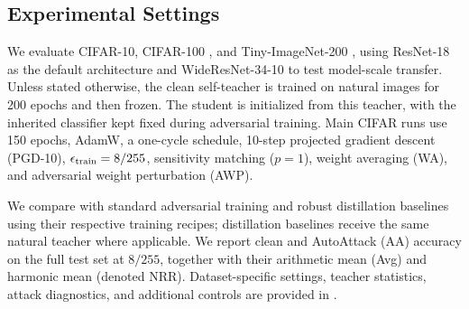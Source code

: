 \documentclass{article} %
\theoremstyle{plain}
\begin{document}
\subsection{Experimental Settings}
We evaluate CIFAR-10, CIFAR-100 \citep{krizhevsky2009learning}, and Tiny-ImageNet-200 \citep{le2015tiny}, using ResNet-18 as the default architecture and WideResNet-34-10 to test model-scale transfer. Unless stated otherwise, the clean self-teacher is trained on natural images for 200 epochs and then frozen. The student is initialized from this teacher, with the inherited classifier kept fixed during adversarial training. Main CIFAR runs use 150 epochs, AdamW, a one-cycle schedule, 10-step projected gradient descent (PGD-10), \(\epsilon_{\rm train}=8/255\), sensitivity matching (\(p=1\)), weight averaging (WA), and adversarial weight perturbation (AWP).

We compare with standard adversarial training and robust distillation baselines using their respective training recipes; distillation baselines receive the same natural teacher where applicable. We report clean and AutoAttack (AA) accuracy on the full test set at \(8/255\), together with their arithmetic mean (Avg) and harmonic mean (denoted NRR). Dataset-specific settings, teacher statistics, attack diagnostics, and additional controls are provided in .
\end{document}
